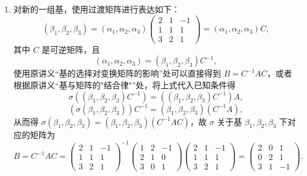 \documentclass[12pt,fontset=fandol]{ctexart}
\begin{document}
\begin{solve}
\begin{enumerate}
        \item 对新的一组基，使用过渡矩阵进行表达如下：
              \[(\beta_{1}, \beta_{2}, \beta_{3})=(\alpha_{1}, \alpha_{2}, \alpha_{3})\begin{pmatrix}
                      2 & 1 & -1 \\
                      1 & 1 & 1  \\
                      3 & 2 & 1
                  \end{pmatrix}=(\alpha_{1}, \alpha_{2}, \alpha_{3}) C,\]
              其中 $C$ 是可逆矩阵，且
              \[(\alpha_{1},\alpha_{2},\alpha_{3})=(\beta_{1},\beta_{2},\beta_{3}) C^{-1},\]
              使用原讲义“基的选择对变换矩阵的影响”处可以直接得到 $B=C^{-1} A C$，或者根据原讲义“基与矩阵的"结合律"”处，将上式代入已知条件得
              \[\sigma((\beta_{1}, \beta_{2}, \beta_{3}) C^{-1})=((\beta_{1}, \beta_{2}, \beta_{3}) C^{-1}) A,\]
              \[(\sigma(\beta_{1}, \beta_{2}, \beta_{3})) C^{-1}=(\beta_{1}, \beta_{2}, \beta_{3})(C^{-1} A),\]
              从而得 $\sigma(\beta_{1}, \beta_{2}, \beta_{3})=(\beta_{1}, \beta_{2}, \beta_{3})(C^{-1} A C)$，故 $\sigma$ 关于基 $\beta_{1}, \beta_{2}, \beta_{3}$ 下对应的矩阵为
              \[B=C^{-1} A C = \begin{pmatrix}
                      2 & 1 & -1 \\
                      1 & 1 & 1  \\
                      3 & 2 & 1
                  \end{pmatrix}^{-1}\begin{pmatrix}
                      1 & 2 & -1 \\
                      2 & 1 & 0  \\
                      3 & 0 & 1
                  \end{pmatrix}\begin{pmatrix}
                      2 & 1 & -1 \\
                      1 & 1 & 1  \\
                      3 & 2 & 1
                  \end{pmatrix}=\begin{pmatrix}
                      2 & 0 & 1  \\
                      0 & 2 & 1  \\
                      3 & 1 & -1
                  \end{pmatrix}.\]


\end{enumerate}
\end{solve}
\end{document}
